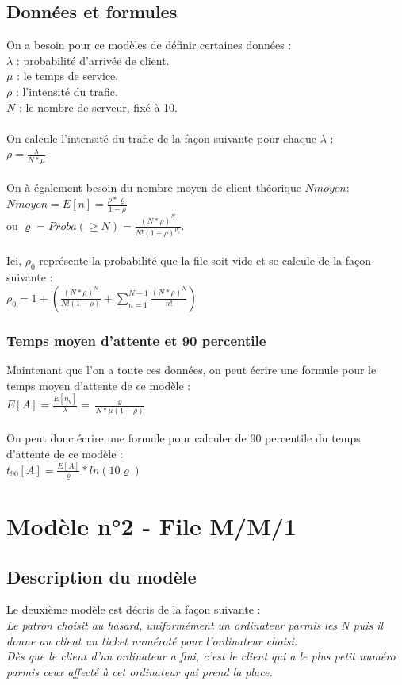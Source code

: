 \documentclass[a4paper,11pt]{article}
\begin{document}
	\subsection{Données et formules}
	On a besoin pour ce modèles de définir certaines données :\\
	$\lambda$ : probabilité d'arrivée de client.\\
	$\mu$ : le temps de service.\\
	$\rho$ : l'intensité du trafic.\\
	$N$ : le nombre de serveur, fixé à 10.\\
	\\
	On calcule l'intensité du trafic de la façon suivante pour chaque 	$\lambda$ : \\
	$\rho = \frac{\lambda}{N*\mu}$\\
	\\
	On à également besoin du nombre moyen de client théorique $Nmoyen$:\\
	$Nmoyen = E[n] = \frac{\rho * \varrho}{1-\rho}$\\
	ou $\varrho = Proba(\ge N) = \frac{(N*\rho)^{N}}{N!(1-\rho)^{\rho_{0}}}$.\\
	\\
	Ici, $\rho_{0}$ représente la probabilité que la file soit vide et se calcule de la façon suivante :\\
	$\rho_{0} = 1 + (\frac{(N*\rho)^{N}}{N!(1-\rho)}+\sum^{N-1}_{n = 1}\frac{(N*\rho)^{N}}{n!})$\\
		\subsubsection{Temps moyen d'attente et 90 percentile}
		Maintenant que l'on a toute ces données, on peut écrire une formule pour le temps moyen d'attente de ce modèle :\\
		$E[A] = \frac{E[n_{q}]}{\lambda} = \frac{\varrho}{N*\mu(1-\rho)}$\\
		\\
		On peut donc écrire une formule pour calculer de 90 percentile du temps d'attente de ce modèle :\\
		$t_{90}[A] = \frac{E[A]}{\varrho}*ln(10\varrho)$\\
	

\section{Modèle n°2 - File M/M/1}
	\subsection{Description du modèle}
	Le deuxième modèle est décris de la façon suivante :\\
	\textit{Le patron choisit au hasard, uniformément un ordinateur parmis les N puis il donne au client un ticket numéroté pour l'ordinateur choisi.\\
			Dès que le client d'un ordinateur a fini, c'est le client qui a le plus petit numéro parmis ceux affecté à cet ordinateur qui prend la place.}
\end{document}
